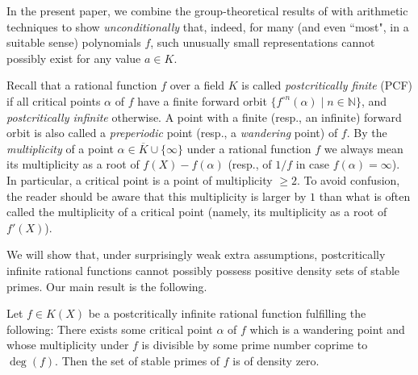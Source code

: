 \documentclass[a4paper]{amsart}
\begin{document}
  In the present paper, we combine the group-theoretical results of \cite{Koe24} with arithmetic techniques to show {\it unconditionally} that, indeed, for many (and even ``most", in a suitable sense) polynomials $f$, such unusually small representations cannot possibly exist for any value $a\in K$.

  Recall that a rational function $f$ over a field $K$ is called {\it postcritically finite} (PCF) if all critical points $\alpha$ of $f$ have a finite forward orbit $\{f^{\circ n}(\alpha)\mid n\in \mathbb{N}\}$, and {\it postcritically infinite} otherwise. A point with a finite (resp., an infinite) forward orbit is also called a {\it preperiodic} point (resp., a {\it wandering} point) of $f$. By the {\it multiplicity} of a point $\alpha\in \overline{K}\cup \{\infty\}$ under a rational function $f$ we always mean its multiplicity as a root of $f(X)-f(\alpha)$ (resp., of $1/f$ in case $f(\alpha)=\infty$). In particular, a critical point is a point of multiplicity $\ge 2$. To avoid confusion, the reader should be aware that this multiplicity is larger by $1$ than what is often called the multiplicity of a critical point (namely, its multiplicity as a root of $f'(X)$).
  
  We will show that, under surprisingly weak extra assumptions, postcritically infinite rational functions cannot possibly possess positive density sets of stable primes. 
  Our main result is the following.
  \begin{theorem}
  \label{thm:main}
  Let $f\in K(X)$ be a postcritically infinite rational function fulfilling the following: There exists some critical point $\alpha$ of $f$ which is a wandering point and whose multiplicity under $f$ is divisible by some prime number coprime to $\deg(f)$.  
  Then the set of stable primes of $f$ is of density zero.
  \end{theorem}
\end{document}
